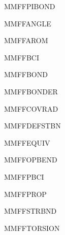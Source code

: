 \documentclass[letterpaper,11pt,english]{sphinxmanual}
\begin{document}
\ignorespaces {}\label{\detokenize{text/keywords:key-mmff-pibond}}
\sphinxAtStartPar
MMFF\sphinxhyphen{}PIBOND

\ignorespaces {}\label{\detokenize{text/keywords:key-mmffangle}}
\sphinxAtStartPar
MMFFANGLE

\ignorespaces {}\label{\detokenize{text/keywords:key-mmffarom}}
\sphinxAtStartPar
MMFFAROM

\ignorespaces {}\label{\detokenize{text/keywords:key-mmffbci}}
\sphinxAtStartPar
MMFFBCI

\ignorespaces {}\label{\detokenize{text/keywords:key-mmffbond}}
\sphinxAtStartPar
MMFFBOND

\ignorespaces {}\label{\detokenize{text/keywords:key-mmffbonder}}
\sphinxAtStartPar
MMFFBONDER

\ignorespaces {}\label{\detokenize{text/keywords:key-mmffcovrad}}
\sphinxAtStartPar
MMFFCOVRAD

\ignorespaces {}\label{\detokenize{text/keywords:key-mmffdefstbn}}
\sphinxAtStartPar
MMFFDEFSTBN

\ignorespaces {}\label{\detokenize{text/keywords:key-mmffequiv}}
\sphinxAtStartPar
MMFFEQUIV

\ignorespaces {}\label{\detokenize{text/keywords:key-mmffopbend}}
\sphinxAtStartPar
MMFFOPBEND

\ignorespaces {}\label{\detokenize{text/keywords:key-mmffpbci}}
\sphinxAtStartPar
MMFFPBCI

\ignorespaces {}\label{\detokenize{text/keywords:key-mmffprop}}
\sphinxAtStartPar
MMFFPROP

\ignorespaces {}\label{\detokenize{text/keywords:key-mmffstrbnd}}
\sphinxAtStartPar
MMFFSTRBND

\ignorespaces {}\label{\detokenize{text/keywords:key-mmfftorsion}}
\sphinxAtStartPar
MMFFTORSION
\end{document}
